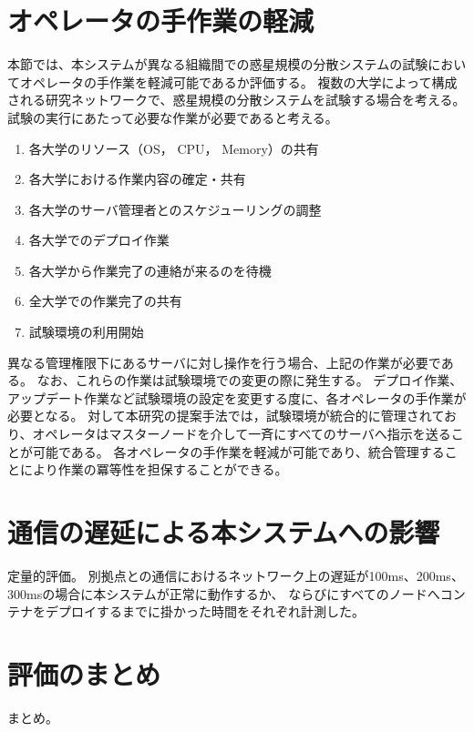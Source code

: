 \section{オペレータの手作業の軽減}

本節では、本システムが異なる組織間での惑星規模の分散システムの試験においてオペレータの手作業を軽減可能であるか評価する。
複数の大学によって構成される研究ネットワークで、惑星規模の分散システムを試験する場合を考える。
試験の実行にあたって必要な作業が必要であると考える。

\begin{enumerate}
  \item 各大学のリソース（OS， CPU， Memory）の共有
  \item 各大学における作業内容の確定・共有
  \item 各大学のサーバ管理者とのスケジューリングの調整
  \item 各大学でのデプロイ作業
  \item 各大学から作業完了の連絡が来るのを待機
  \item 全大学での作業完了の共有
  \item 試験環境の利用開始
\end{enumerate}

異なる管理権限下にあるサーバに対し操作を行う場合、上記の作業が必要である。
なお、これらの作業は試験環境での変更の際に発生する。
デプロイ作業、アップデート作業など試験環境の設定を変更する度に、各オペレータの手作業が必要となる。
対して本研究の提案手法では，試験環境が統合的に管理されており、オペレータはマスターノードを介して一斉にすべてのサーバへ指示を送ることが可能である。
各オペレータの手作業を軽減が可能であり、統合管理することにより作業の冪等性を担保することができる。

\section{通信の遅延による本システムへの影響}

定量的評価。
別拠点との通信におけるネットワーク上の遅延が100ms、200ms、300msの場合に本システムが正常に動作するか、
ならびにすべてのノードへコンテナをデプロイするまでに掛かった時間をそれぞれ計測した。

\section{評価のまとめ}

まとめ。

